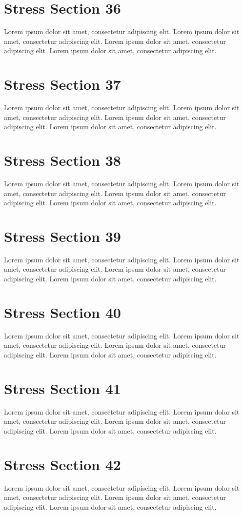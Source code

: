 \documentclass{article}
\begin{document}
\section{Stress Section 36}
Lorem ipsum dolor sit amet, consectetur adipiscing elit. Lorem ipsum dolor sit amet, consectetur adipiscing elit. Lorem ipsum dolor sit amet, consectetur adipiscing elit. Lorem ipsum dolor sit amet, consectetur adipiscing elit. \newpage
\section{Stress Section 37}
Lorem ipsum dolor sit amet, consectetur adipiscing elit. Lorem ipsum dolor sit amet, consectetur adipiscing elit. Lorem ipsum dolor sit amet, consectetur adipiscing elit. Lorem ipsum dolor sit amet, consectetur adipiscing elit. \newpage
\section{Stress Section 38}
Lorem ipsum dolor sit amet, consectetur adipiscing elit. Lorem ipsum dolor sit amet, consectetur adipiscing elit. Lorem ipsum dolor sit amet, consectetur adipiscing elit. Lorem ipsum dolor sit amet, consectetur adipiscing elit. \newpage
\section{Stress Section 39}
Lorem ipsum dolor sit amet, consectetur adipiscing elit. Lorem ipsum dolor sit amet, consectetur adipiscing elit. Lorem ipsum dolor sit amet, consectetur adipiscing elit. Lorem ipsum dolor sit amet, consectetur adipiscing elit. \newpage
\section{Stress Section 40}
Lorem ipsum dolor sit amet, consectetur adipiscing elit. Lorem ipsum dolor sit amet, consectetur adipiscing elit. Lorem ipsum dolor sit amet, consectetur adipiscing elit. Lorem ipsum dolor sit amet, consectetur adipiscing elit. \newpage
\section{Stress Section 41}
Lorem ipsum dolor sit amet, consectetur adipiscing elit. Lorem ipsum dolor sit amet, consectetur adipiscing elit. Lorem ipsum dolor sit amet, consectetur adipiscing elit. Lorem ipsum dolor sit amet, consectetur adipiscing elit. \newpage
\section{Stress Section 42}
Lorem ipsum dolor sit amet, consectetur adipiscing elit. Lorem ipsum dolor sit amet, consectetur adipiscing elit. Lorem ipsum dolor sit amet, consectetur adipiscing elit. Lorem ipsum dolor sit amet, consectetur adipiscing elit. \newpage
\end{document}
